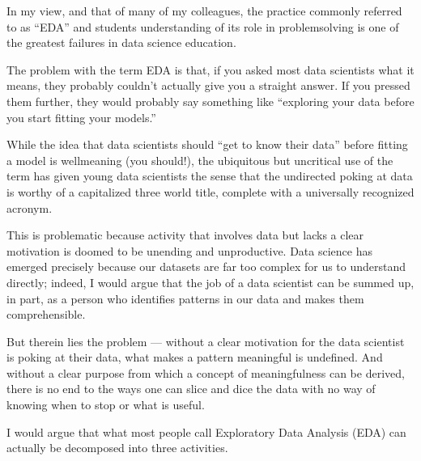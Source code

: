\documentclass[letterpaper,10pt,english]{jupyterBook}
\begin{document}
\sphinxAtStartPar
In my view, and that of many of my colleagues, the practice commonly referred to as “EDA” and students understanding of its role in problem\sphinxhyphen{}solving is one of the greatest failures in data science education.

\sphinxAtStartPar
The problem with the term EDA is that, if you asked most data scientists what it means, they probably couldn’t actually give you a straight answer. If you pressed them further, they would probably say something like “exploring your data before you start fitting your models.”

\sphinxAtStartPar
While the idea that data scientists should “get to know their data” before fitting a model is well\sphinxhyphen{}meaning (you  should!), the ubiquitous but uncritical use of the term has given young data scientists the sense that the undirected poking at data is worthy of a capitalized three world title, complete with a universally recognized acronym.

\sphinxAtStartPar
This is problematic because  activity that involves data but lacks a clear motivation is doomed to be unending and unproductive. Data science has emerged precisely because our datasets are far too complex for us to understand directly; indeed, I would argue that the job of a data scientist can be summed up, in part, as a person who identifies  patterns in our data and makes them comprehensible.

\sphinxAtStartPar
But therein lies the problem — without a clear motivation for  the data scientist is poking at their data, what makes a pattern meaningful is undefined. And without a clear purpose from which a concept of meaningfulness can be derived, there is no end to the ways one can slice and dice the data with no way of knowing when to stop or what is useful.

\sphinxAtStartPar
I would argue that what most people call Exploratory Data Analysis (EDA) can actually be decomposed into three activities.
\end{document}
